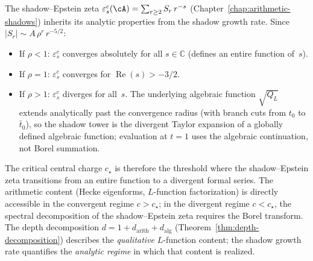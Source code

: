 \begin{remark}
\label{rem:arithmetic-threshold}
The shadow--Epstein zeta
$\varepsilon^c_s(\cA) = \sum_{r \geq 2}
S_r\,r^{-s}$
\textup{(}Chapter~\textup{\ref{chap:arithmetic-shadows})}
inherits its analytic properties from the shadow growth
rate.  Since $|S_r| \sim A\,\rho^r\,r^{-5/2}$:
\begin{itemize}[nosep]
\item If $\rho < 1$: $\varepsilon^c_s$ converges
  absolutely for all $s \in \mathbb{C}$
  \textup{(}defines an entire function of~$s$\textup{)}.
\item If $\rho = 1$: $\varepsilon^c_s$ converges for
  $\operatorname{Re}(s) > -3/2$.
\item If $\rho > 1$: $\varepsilon^c_s$ diverges for all~$s$.
  The underlying algebraic function
  $\sqrt{Q_L}$ extends analytically past the
  convergence radius
  \textup{(}with branch cuts from $t_0$ to
  $\bar{t}_0$\textup{)}, so the shadow tower is the
  divergent Taylor expansion of a globally defined
  algebraic function; evaluation at $t = 1$ uses
  the algebraic continuation, not Borel summation.
\end{itemize}
The critical central charge $c_\star$ is therefore the
threshold where the shadow--Epstein zeta transitions from
an entire function to a divergent formal series.
The arithmetic content
\textup{(}Hecke eigenforms, $L$-function
factorization\textup{)} is directly accessible in the
convergent regime $c > c_\star$; in the divergent regime
$c < c_\star$, the spectral decomposition of the
shadow--Epstein zeta requires the Borel transform.
The depth decomposition
$d = 1 + d_{\mathrm{arith}} + d_{\mathrm{alg}}$
\textup{(}Theorem~\textup{\ref{thm:depth-decomposition})}
describes the \emph{qualitative} $L$-function content;
the shadow growth rate quantifies the \emph{analytic
  regime} in which that content is realized.
\end{remark}

